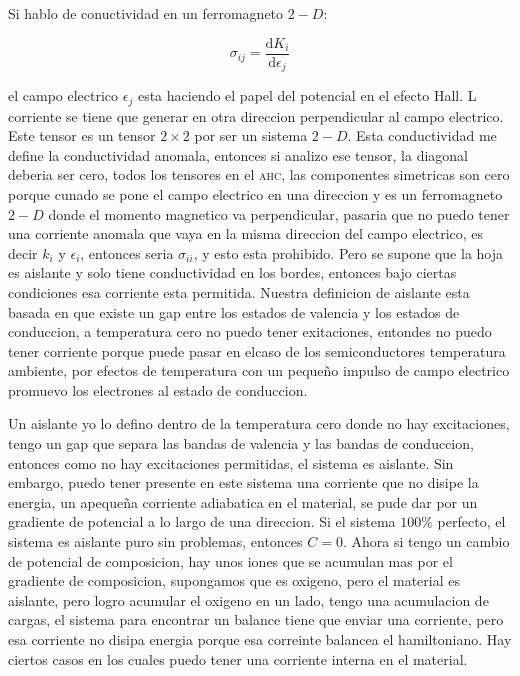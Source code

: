 \documentclass[11pt,fleqn]{book}
\begin{document}
Si hablo de conuctividad en un ferromagneto $2-D$:

\begin{equation}
    \sigma_{ij}=\frac{\mathrm{d}K_{i}}{\mathrm{d}\epsilon_{j}}
\end{equation}

el campo electrico $\epsilon_{j}$ esta haciendo el papel del potencial en el efecto Hall. L corriente se tiene que generar en otra direccion perpendicular al campo electrico. Este tensor es un tensor $2\times2$ por ser un sistema $2-D$. Esta conductividad me define la conductividad anomala, entonces si analizo ese tensor, la diagonal deberia ser cero, todos los tensores en el \textsc{ahc}, las componentes simetricas son cero porque cunado se pone el campo electrico en una direccion y es un ferromagneto $2-D$ donde el momento magnetico va perpendicular, pasaria que no puedo tener una corriente anomala que vaya en la misma direccion del campo electrico, es decir $k_{i}$ y $\epsilon_{i}$, entonces seria $\sigma_{ii}$, y esto esta prohibido. Pero se supone que la hoja es aislante y solo tiene conductividad en los bordes, entonces bajo ciertas condiciones esa corriente esta permitida. Nuestra definicion de aislante esta basada en que existe un gap entre los estados de valencia y los estados de conduccion, a temperatura cero no puedo tener exitaciones, entondes no puedo tener corriente porque puede pasar en elcaso de los semiconductores  temperatura ambiente, por efectos de temperatura con un pequeño impulso de campo electrico promuevo los electrones al estado de conduccion. 

Un aislante yo lo defino dentro de la temperatura cero donde no hay excitaciones, tengo un gap que separa las bandas de valencia y las bandas de conduccion, entonces como no hay excitaciones permitidas, el sistema es aislante. Sin embargo, puedo tener presente en este sistema una corriente que no disipe la energia, un apequeña corriente adiabatica en el material, se pude dar por un gradiente de potencial a lo largo de una direccion. Si el sistema $100\%$ perfecto, el sistema es aislante puro sin problemas, entonces $C=0$. Ahora si tengo un cambio de potencial de composicion, hay unos iones que se acumulan mas por el gradiente de composicion,  supongamos que es oxigeno, pero el material es aislante, pero logro acumular el oxigeno en un lado, tengo una acumulacion de cargas, el sistema para encontrar un balance tiene que enviar una corriente, pero esa corriente no disipa energia porque esa correinte balancea el hamiltoniano. Hay ciertos casos en los cuales puedo tener una corriente interna en el material.
\end{document}
